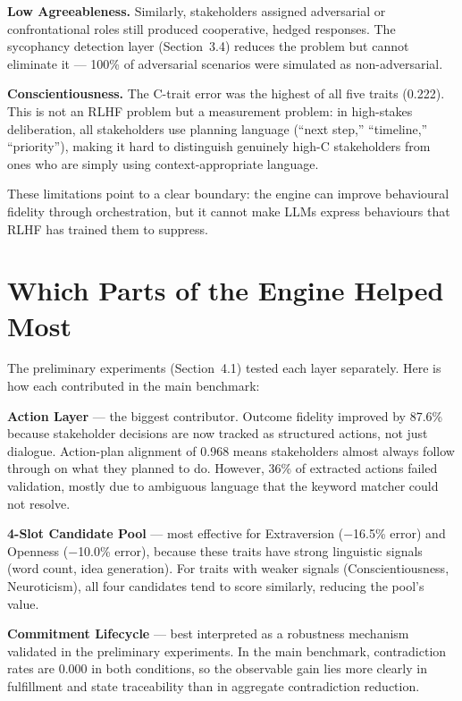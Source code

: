 \documentclass[12pt, a4paper]{report}
\begin{document}
\textbf{Low Agreeableness.} Similarly, stakeholders assigned adversarial or confrontational roles still produced cooperative, hedged responses. The sycophancy detection layer (Section~3.4) reduces the problem but cannot eliminate it --- 100\% of adversarial scenarios were simulated as non-adversarial.

\textbf{Conscientiousness.} The C-trait error was the highest of all five traits (0.222). This is not an RLHF problem but a measurement problem: in high-stakes deliberation, all stakeholders use planning language (``next step,'' ``timeline,'' ``priority''), making it hard to distinguish genuinely high-C stakeholders from ones who are simply using context-appropriate language.

These limitations point to a clear boundary: the engine can improve behavioural fidelity through orchestration, but it cannot make LLMs express behaviours that RLHF has trained them to suppress.


\section{Which Parts of the Engine Helped Most}

The preliminary experiments (Section~4.1) tested each layer separately. Here is how each contributed in the main benchmark:

\textbf{Action Layer} --- the biggest contributor. Outcome fidelity improved by 87.6\% because stakeholder decisions are now tracked as structured actions, not just dialogue. Action-plan alignment of 0.968 means stakeholders almost always follow through on what they planned to do. However, 36\% of extracted actions failed validation, mostly due to ambiguous language that the keyword matcher could not resolve.

\textbf{4-Slot Candidate Pool} --- most effective for Extraversion ($-$16.5\% error) and Openness ($-$10.0\% error), because these traits have strong linguistic signals (word count, idea generation). For traits with weaker signals (Conscientiousness, Neuroticism), all four candidates tend to score similarly, reducing the pool's value.

\textbf{Commitment Lifecycle} --- best interpreted as a robustness mechanism validated in the preliminary experiments. In the main benchmark, contradiction rates are 0.000 in both conditions, so the observable gain lies more clearly in fulfillment and state traceability than in aggregate contradiction reduction.
\end{document}
